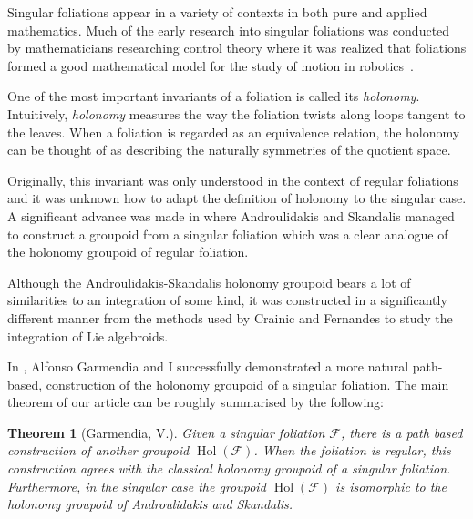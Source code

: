 \documentclass[11pt, letterpaper]{article}
\newcommand{\F}{\mathcal{F}}
\DeclareMathOperator{\Hol}{Hol}
\newtheorem{theorem}{Theorem}
\begin{document}
Singular foliations appear in a variety of contexts in both pure and applied mathematics. Much of the early research into singular foliations was conducted by mathematicians researching control theory where it was realized that foliations formed a good mathematical model for the study of motion in robotics~\cite{narmanov2012foliation}.


One of the most important invariants of a foliation is called its \emph{holonomy}. Intuitively, \emph{holonomy} measures the way the foliation twists along loops tangent to the leaves. When a foliation is regarded as an equivalence relation, the holonomy can be thought of as describing the naturally symmetries of the quotient space. 

Originally, this invariant was only understood in the context of regular foliations and it was unknown how to adapt the definition of holonomy to the singular case. A significant advance was made in \cite{AS.Holonomy} where Androulidakis and Skandalis managed to construct a groupoid from a singular foliation which was a clear analogue of the holonomy groupoid of regular foliation.

Although the Androulidakis-Skandalis holonomy groupoid bears a lot of similarities to an integration of some kind, it was constructed in a significantly different manner from the methods used by Crainic and Fernandes to study the integration of Lie algebroids. 

In \cite{villatoro2019integration}, Alfonso Garmendia and I successfully demonstrated a more natural path-based, construction of the holonomy groupoid of a singular foliation. The main theorem of our article can be roughly summarised by the following:

\begin{theorem}[Garmendia, V.\cite{villatoro2019integration}]\label{thm:sing.fol.paths}
Given a singular foliation \( \F \), there is a path based construction of another groupoid \( \Hol(\F) \). When the foliation is regular, this construction agrees with the classical holonomy groupoid of a singular foliation. Furthermore, in the singular case the groupoid \( \Hol(\F) \) is isomorphic to the holonomy groupoid of Androulidakis and Skandalis.
\end{theorem}
\end{document}
